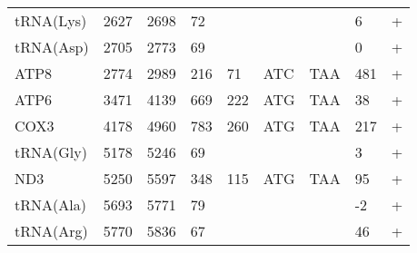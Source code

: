 \documentclass[../DISSERTACAO_MAIN.tex]{subfiles}
\begin{document}
\begin{longtable}{llllllllllllllllllllll}
			tRNA(Lys)    & 2627           & \multicolumn{2}{l}{2698}  & \multicolumn{2}{l}{72}         & \multicolumn{3}{l}{}                          & \multicolumn{3}{l}{}              & \multicolumn{3}{l}{}      & \multicolumn{3}{l}{6}           & \multicolumn{4}{l}{+}                  \\
			tRNA(Asp)    & 2705           & \multicolumn{2}{l}{2773}  & \multicolumn{2}{l}{69}         & \multicolumn{3}{l}{}                          & \multicolumn{3}{l}{}              & \multicolumn{3}{l}{}      & \multicolumn{3}{l}{0}           & \multicolumn{4}{l}{+}                  \\
			ATP8         & 2774           & \multicolumn{2}{l}{2989}  & \multicolumn{2}{l}{216}        & \multicolumn{3}{l}{71}                        & \multicolumn{3}{l}{ATC}           & \multicolumn{3}{l}{TAA}   & \multicolumn{3}{l}{481}         & \multicolumn{4}{l}{+}                  \\
			ATP6         & 3471           & \multicolumn{2}{l}{4139}  & \multicolumn{2}{l}{669}        & \multicolumn{3}{l}{222}                       & \multicolumn{3}{l}{ATG}           & \multicolumn{3}{l}{TAA}   & \multicolumn{3}{l}{38}          & \multicolumn{4}{l}{+}                  \\
			COX3         & 4178           & \multicolumn{2}{l}{4960}  & \multicolumn{2}{l}{783}        & \multicolumn{3}{l}{260}                       & \multicolumn{3}{l}{ATG}           & \multicolumn{3}{l}{TAA}   & \multicolumn{3}{l}{217}         & \multicolumn{4}{l}{+}                  \\
			tRNA(Gly)    & 5178           & \multicolumn{2}{l}{5246}  & \multicolumn{2}{l}{69}         & \multicolumn{3}{l}{}                          & \multicolumn{3}{l}{}              & \multicolumn{3}{l}{}      & \multicolumn{3}{l}{3}           & \multicolumn{4}{l}{+}                  \\
			ND3          & 5250           & \multicolumn{2}{l}{5597}  & \multicolumn{2}{l}{348}        & \multicolumn{3}{l}{115}                       & \multicolumn{3}{l}{ATG}           & \multicolumn{3}{l}{TAA}   & \multicolumn{3}{l}{95}          & \multicolumn{4}{l}{+}                  \\
			tRNA(Ala)    & 5693           & \multicolumn{2}{l}{5771}  & \multicolumn{2}{l}{79}         & \multicolumn{3}{l}{}                          & \multicolumn{3}{l}{}              & \multicolumn{3}{l}{}      & \multicolumn{3}{l}{-2}          & \multicolumn{4}{l}{+}                  \\
			tRNA(Arg)    & 5770           & \multicolumn{2}{l}{5836}  & \multicolumn{2}{l}{67}         & \multicolumn{3}{l}{}                          & \multicolumn{3}{l}{}              & \multicolumn{3}{l}{}      & \multicolumn{3}{l}{46}          & \multicolumn{4}{l}{+}                  \\

\end{longtable}
\end{document}

